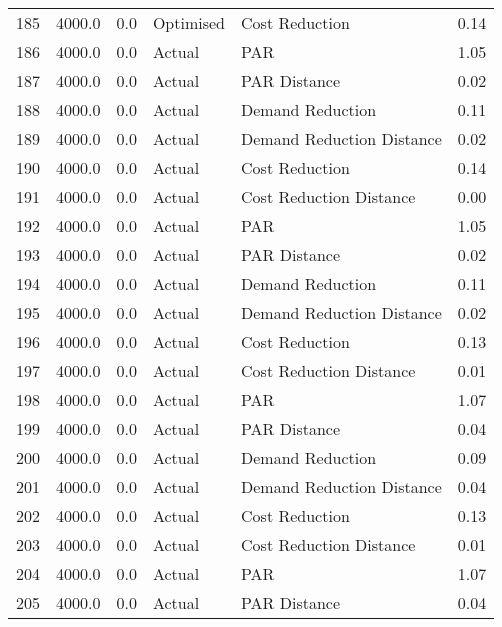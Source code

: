 \begin{longtable}{lrrllr}
185  &       4000.0 &     0.0 &      Optimised &             Cost Reduction &   0.14 \\
186  &       4000.0 &     0.0 &         Actual &                        PAR &   1.05 \\
187  &       4000.0 &     0.0 &         Actual &               PAR Distance &   0.02 \\
188  &       4000.0 &     0.0 &         Actual &           Demand Reduction &   0.11 \\
189  &       4000.0 &     0.0 &         Actual &  Demand Reduction Distance &   0.02 \\
190  &       4000.0 &     0.0 &         Actual &             Cost Reduction &   0.14 \\
191  &       4000.0 &     0.0 &         Actual &    Cost Reduction Distance &   0.00 \\
192  &       4000.0 &     0.0 &         Actual &                        PAR &   1.05 \\
193  &       4000.0 &     0.0 &         Actual &               PAR Distance &   0.02 \\
194  &       4000.0 &     0.0 &         Actual &           Demand Reduction &   0.11 \\
195  &       4000.0 &     0.0 &         Actual &  Demand Reduction Distance &   0.02 \\
196  &       4000.0 &     0.0 &         Actual &             Cost Reduction &   0.13 \\
197  &       4000.0 &     0.0 &         Actual &    Cost Reduction Distance &   0.01 \\
198  &       4000.0 &     0.0 &         Actual &                        PAR &   1.07 \\
199  &       4000.0 &     0.0 &         Actual &               PAR Distance &   0.04 \\
200  &       4000.0 &     0.0 &         Actual &           Demand Reduction &   0.09 \\
201  &       4000.0 &     0.0 &         Actual &  Demand Reduction Distance &   0.04 \\
202  &       4000.0 &     0.0 &         Actual &             Cost Reduction &   0.13 \\
203  &       4000.0 &     0.0 &         Actual &    Cost Reduction Distance &   0.01 \\
204  &       4000.0 &     0.0 &         Actual &                        PAR &   1.07 \\
205  &       4000.0 &     0.0 &         Actual &               PAR Distance &   0.04 \\

\end{longtable}
